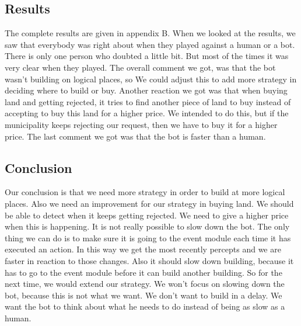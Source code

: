 \subsection{Results}
The complete results are given in appendix B.
When we looked at the results, we saw that everybody was right about when they played against a human or a bot. There is only one person who doubted a little bit. But most of the times it was very clear when they played. The overall comment we got, was that the bot wasn't building on logical places, so We could adjust this to add more strategy in deciding where to build or buy. Another reaction we got was that when buying land and getting rejected, it tries to find another piece of land to buy instead of accepting to buy this land for a higher price. We intended to do this, but if the municipality keeps rejecting our request, then we have to buy it for a higher price. The last comment we got was that the bot is faster than a human. 
\subsection{Conclusion}
Our conclusion is that we need more strategy in order to build at more logical places. Also we need an improvement for our strategy in buying land. We should be able to detect when it keeps getting rejected. We need to give a higher price when this is happening. It is not really possible to slow down the bot. The only thing we can do is to make sure it is going to the event module each time it has executed an action. In this way we get the most recently percepts and we are faster in reaction to those changes. Also it should slow down building, because it has to go to the event module before it can build another building. So for the next time, we would extend our strategy. We won't focus on slowing down the bot, because this is not what we want. We don't want to build in a delay. We want the bot to think about what he needs to do instead of being as slow as a human.
\newpage
